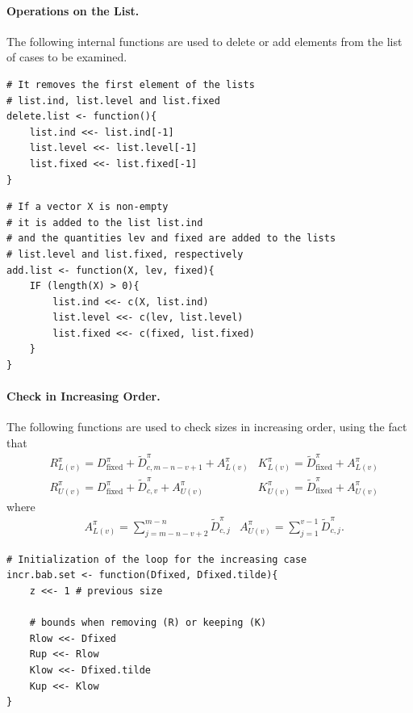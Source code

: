 \documentclass[11pt,a4paper,openright,twoside]{article}
\begin{document}
\paragraph{Operations on the List.} The following internal functions are used to delete or add elements from the list of cases to be examined.

\begin{lstlisting}
# It removes the first element of the lists
# list.ind, list.level and list.fixed
delete.list <- function(){
	list.ind <<- list.ind[-1]
	list.level <<- list.level[-1]
	list.fixed <<- list.fixed[-1]
}
\end{lstlisting}

\begin{lstlisting}
# If a vector X is non-empty
# it is added to the list list.ind
# and the quantities lev and fixed are added to the lists
# list.level and list.fixed, respectively
add.list <- function(X, lev, fixed){
	IF (length(X) > 0){
		list.ind <<- c(X, list.ind)
		list.level <<- c(lev, list.level)
		list.fixed <<- c(fixed, list.fixed)
	}
}
\end{lstlisting}




\vspace{3mm}
\paragraph{Check in Increasing Order.} The following functions are used to check sizes in increasing order, using the fact that
\begin{align*}
&R_{L(v)}^{\pi}=D_{\text{fixed}}^{\pi}+\tilde{D}_{c,m-n-v+1}^{\pi} + A_{L(v)}^{\pi} & K_{L(v)}^{\pi}=\tilde{D}_{\text{fixed}}^{\pi}+A_{L(v)}^{\pi}\\
&R_{U(v)}^{\pi}=D_{\text{fixed}}^{\pi}+\tilde{D}_{c,v}^{\pi}+A_{U(v)}^{\pi} & K_{U(v)}^{\pi}=\tilde{D}_{\text{fixed}}^{\pi}+A_{U(v)}^{\pi}
\end{align*}
where
\begin{align*}
& A_{L(v)}^{\pi}=\sum_{j=m-n-v+2}^{m-n} \tilde{D}_{c,j}^{\pi} & A_{U(v)}^{\pi}=\sum_{j=1}^{v-1}  \tilde{D}_{c,j}^{\pi}.
\end{align*}

\begin{lstlisting}
# Initialization of the loop for the increasing case
incr.bab.set <- function(Dfixed, Dfixed.tilde){
	z <<- 1 # previous size

	# bounds when removing (R) or keeping (K)
	Rlow <<- Dfixed
	Rup <<- Rlow
	Klow <<- Dfixed.tilde
	Kup <<- Klow
}
\end{lstlisting}
\end{document}
